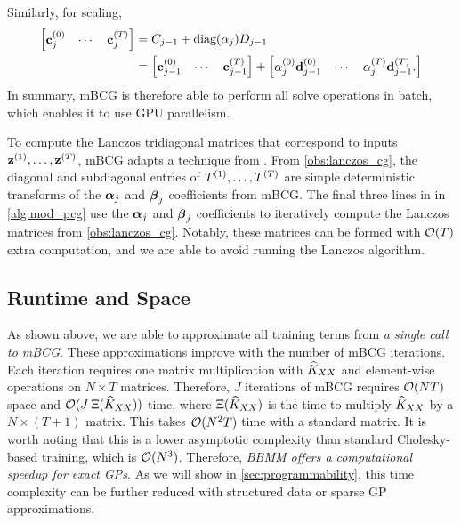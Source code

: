 %
Similarly, for scaling,
%
\begin{align*}
  \begin{bmatrix}
    \mathbf{c}_j^{(0)} & \cdots & \mathbf{c}_j^{(T)}
  \end{bmatrix}
  &=
  C_{j-1} + \text{diag}(\alpha_j) D_{j-1}
  \\
  &=
  \begin{bmatrix}
    \mathbf{c}_{j-1}^{(0)} & \cdots & \mathbf{c}_{j-1}^{(T)}
  \end{bmatrix}
  +
  \begin{bmatrix}
    \alpha_{j}^{(0)} \mathbf{d}_{j-1}^{(0)} & \cdots &  \alpha_{j}^{(T)} \mathbf{d}_{j-1}^{(T)}.
  \end{bmatrix}
\end{align*}
%
In summary, mBCG is therefore able to perform all solve operations in batch, which enables it to use GPU parallelism.

To compute the Lanczos tridiagonal matrices  that correspond to inputs $\mathbf{z}^{(1)}, \ldots, \mathbf{z}^{(T)}$, mBCG adapts a technique from \citet{saad2003iterative}.
From \cref{obs:lanczos_cg}, the diagonal and subdiagonal entries of $T^{(1)}, \ldots, T^{(T)}$ are simple deterministic transforms of the $\boldsymbol{\alpha}_j$ and $\boldsymbol{\beta}_j$ coefficients from mBCG.
The final three lines in {\color{\colornew} } in \cref{alg:mod_pcg} use the $\boldsymbol{\alpha}_j$ and $\boldsymbol{\beta}_j$ coefficients to iteratively compute the Lanczos matrices from \cref{obs:lanczos_cg}.
Notably, these matrices can be formed with $\bigo{T}$ extra computation, and we are able to avoid running the Lanczos algorithm.


\subsection{Runtime and Space}
As shown above, we are able to approximate all training terms from \emph{a single call to mBCG}.
These approximations improve with the number of mBCG iterations.
Each iteration requires one matrix multiplication with $\widehat{K}_{XX}$ and element-wise operations on $N \times T$ matrices.
Therefore, $J$ iterations of mBCG requires $\bigo{NT}$ space and $\bigo{J \: \mmm{\trainK}}$ time,
where $\Xi (\widehat{K}_{XX})$ is the time to multiply $\widehat{K}_{XX}$ by a $N \times (T + 1)$ matrix.
This takes $\bigo{N^2 T}$ time with a standard matrix.
It is worth noting that this is a lower asymptotic complexity than standard Cholesky-based training, which is $\bigo{N^3}$.
Therefore, \emph{BBMM offers a computational speedup for exact GPs}.
As we will show in \cref{sec:programmability}, this time complexity can be further reduced with structured data or sparse GP approximations.

